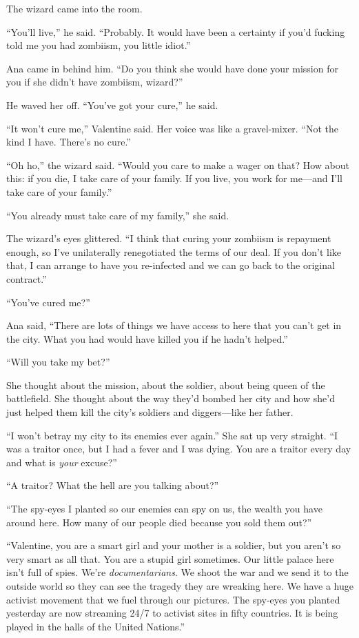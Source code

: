 The wizard came into the room.

“You’ll live,” he said. “Probably. It would have been a certainty
if you’d fucking told me you had zombiism, you little idiot.”

Ana came in behind him. “Do you think she would have done your
mission for you if she didn’t have zombiism, wizard?”

He waved her off. “You’ve got your cure,” he said.

“It won’t cure me,” Valentine said. Her voice was like a
gravel-mixer. “Not the kind I have. There’s no cure.”

“Oh ho,” the wizard said. “Would you care to make a wager on that?
How about this: if you die, I take care of your family. If you
live, you work for me—and I’ll take care of your family.”

“You already must take care of my family,” she said.

The wizard’s eyes glittered. “I think that curing your zombiism is
repayment enough, so I’ve unilaterally renegotiated the terms of
our deal. If you don’t like that, I can arrange to have you
re-infected and we can go back to the original contract.”

“You’ve cured me?”

Ana said, “There are lots of things we have access to here that you
can’t get in the city. What you had would have killed you if he
hadn’t helped.”

“Will you take my bet?”

She thought about the mission, about the soldier, about being queen
of the battlefield. She thought about the way they’d bombed her
city and how she’d just helped them kill the city’s soldiers and
diggers—like her father.

“I won’t betray my city to its enemies ever again.” She sat up very
straight. “I was a traitor once, but I had a fever and I was dying.
You are a traitor every day and what is \emph{your} excuse?”

“A traitor? What the hell are you talking about?”

“The spy-eyes I planted so our enemies can spy on us, the wealth
you have around here. How many of our people died because you sold
them out?”

“Valentine, you are a smart girl and your mother is a soldier, but
you aren’t so very smart as all that. You are a stupid girl
sometimes. Our little palace here isn’t full of spies. We’re
\emph{documentarians}. We shoot the war and we send it to the
outside world so they can see the tragedy they are wreaking here.
We have a huge activist movement that we fuel through our pictures.
The spy-eyes you planted yesterday are now streaming 24/7 to
activist sites in fifty countries. It is being played in the halls
of the United Nations.”

